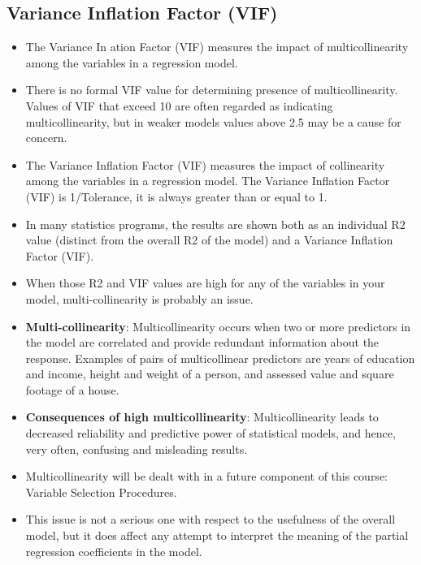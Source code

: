 \documentclass[a4paper,12pt]{article}
\begin{document}
\subsection{Variance Inflation Factor (VIF)}
\begin{itemize}
\item  The Variance In
ation Factor (VIF) measures the impact of multicollinearity among the variables in a
regression model.
\item  There is no formal VIF value for determining presence of multicollinearity. Values of VIF that exceed 10
are often regarded as indicating multicollinearity, but in weaker models values above 2.5 may be a cause
for concern.

\item The Variance Inflation Factor (VIF) measures the impact of collinearity among the variables in a regression model. The Variance Inflation Factor (VIF) is 1/Tolerance, it is always greater than or equal to 1. 


\item  In many statistics programs, the results are shown both as an individual R2 value (distinct from the
overall R2 of the model) and a Variance Inflation Factor (VIF).
\item  When those R2 and VIF values are high for any of the variables in your model, multi-collinearity is
probably an issue.

\item \textbf{Multi-collinearity}: Multicollinearity occurs when two or more predictors in the model are
correlated and provide redundant information about the response. Examples of pairs of multicollinear predictors are years of education and income, height and weight of a person, and assessed value and square footage
of a house.

\item \textbf{Consequences of high multicollinearity}:
Multicollinearity leads to decreased reliability and predictive power of statistical models, and hence, very often, confusing and misleading results.
\item Multicollinearity will be dealt with in a future component of this course: Variable Selection Procedures.
\item This issue is not a serious one with respect to the
usefulness of the overall model, but it does affect any attempt to interpret the meaning of the partial regression
coefficients in the model.


\end{itemize}
\end{document}
